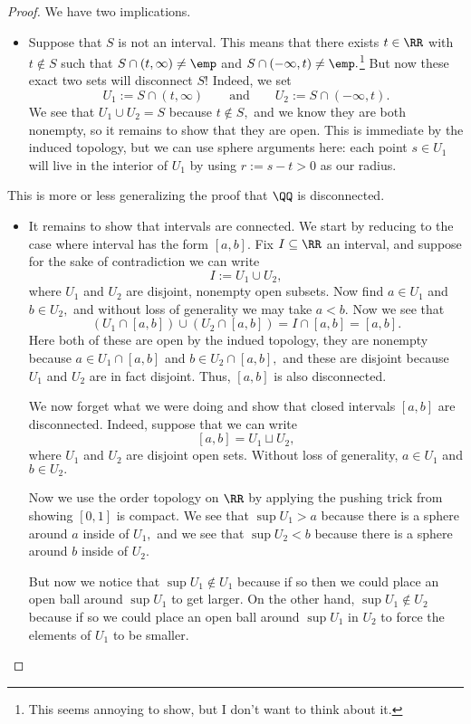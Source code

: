 \begin{proof}
	We have two implications.
	\begin{itemize}
		\item Suppose that $S$ is not an interval. This means that there exists $t\in\RR$ with $t\notin S$ such that $S\cap(t,\infty)\ne\emp$ and $S\cap(-\infty,t)\ne\emp.$\footnote{This seems annoying to show, but I don't want to think about it.} But now these exact two sets will disconnect $S$! Indeed, we set
		\[U_1:=S\cap(t,\infty)\qquad\text{and}\qquad U_2:=S\cap(-\infty,t).\]
		We see that $U_1\cup U_2=S$ because $t\notin S,$ and we know they are both nonempty, so it remains to show that they are open. This is immediate by the induced topology, but we can use sphere arguments here: each point $s\in U_1$ will live in the interior of $U_1$ by using $r:=s-t>0$ as our radius.
	\end{itemize}
	\begin{remark}
		This is more or less generalizing the proof that $\QQ$ is disconnected.
	\end{remark}
	\begin{itemize}
		\item It remains to show that intervals are connected. We start by reducing to the case where interval has the form $[a,b].$ Fix $I\subseteq\RR$ an interval, and suppose for the sake of contradiction we can write
		\[I:=U_1\cup U_2,\]
		where $U_1$ and $U_2$ are disjoint, nonempty open subsets. Now find $a\in U_1$ and $b\in U_2,$ and without loss of generality we may take $a<b.$ Now we see that
		\[(U_1\cap[a,b])\cup(U_2\cap[a,b])=I\cap[a,b]=[a,b].\]
		Here both of these are open by the indued topology, they are nonempty because $a\in U_1\cap[a,b]$ and $b\in U_2\cap[a,b],$ and these are disjoint because $U_1$ and $U_2$ are in fact disjoint. Thus, $[a,b]$ is also disconnected.

		We now forget what we were doing and show that closed intervals $[a,b]$ are disconnected. Indeed, suppose that we can write
		\[[a,b]=U_1\sqcup U_2,\]
		where $U_1$ and $U_2$ are disjoint open sets. Without loss of generality, $a\in U_1$ and $b\in U_2.$

		Now we use the order topology on $\RR$ by applying the pushing trick from showing $[0,1]$ is compact. We see that $\sup U_1>a$ because there is a sphere around $a$ inside of $U_1,$ and we see that $\sup U_2<b$ because there is a sphere around $b$ inside of $U_2.$
		
		But now we notice that $\sup U_1\notin U_1$ because if so then we could place an open ball around $\sup U_1$ to get larger. On the other hand, $\sup U_1\notin U_2$ because if so we could place an open ball around $\sup U_1$ in $U_2$ to force the elements of $U_1$ to be smaller.
		\qedhere
	\end{itemize}
\end{proof}
